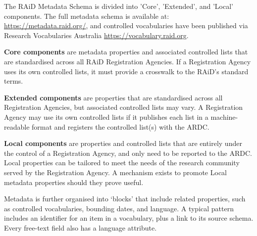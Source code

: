 The RAiD Metadata Schema is divided into 'Core', 'Extended', and 'Local' components. The full metadata schema is available at: \href{https://metadata.raid.org/}{https://metadata.raid.org/}, and controlled vocabularies have been published via Research Vocabularies Australia \href{https://vocabulary.raid.org}{https://vocabulary.raid.org}.

\textbf{Core components} are metadata properties and associated controlled lists that are standardised across all RAiD Registration Agencies. If a Registration Agency uses its own controlled lists, it must provide a crosswalk to the RAiD’s standard terms.

\textbf{Extended components} are properties that are standardised across all Registration Agencies, but associated controlled lists may vary. A Registration Agency may use its own controlled lists if it publishes each list in a machine-readable format and registers the controlled list(s) with the ARDC. 

\textbf{Local components} are properties and controlled lists that are entirely under the control of a Registration Agency, and only need to be reported to the ARDC. Local properties can be tailored to meet the needs of the research community served by the Registration Agency. A mechanism exists to promote Local metadata properties should they prove useful.

Metadata is further organised into ‘blocks’ that include related properties, such as controlled vocabularies, bounding dates, and language. A typical pattern includes an identifier for an item in a vocabulary, plus a link to its source schema. Every free-text field also has a language attribute.